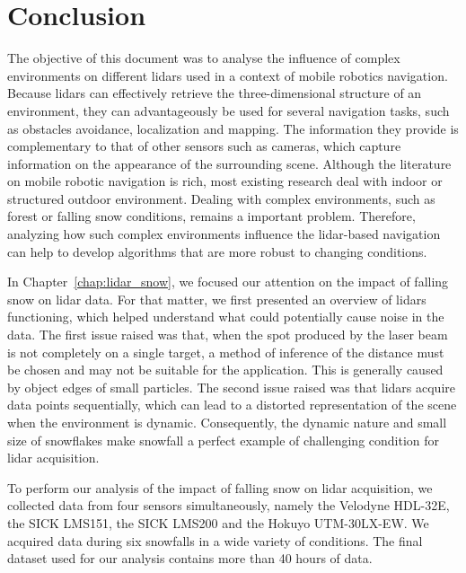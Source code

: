 \chapter*{Conclusion}

The objective of this document was to analyse the influence of complex environments on different \gls*{lidar}s used in a context of mobile robotics navigation. Because \gls*{lidar}s can effectively retrieve the three-dimensional structure of an environment, they can advantageously be used for several navigation tasks, such as obstacles avoidance, localization and mapping. The information they provide is complementary to that of other sensors such as cameras, which capture information on the appearance of the surrounding scene. Although the literature on mobile robotic navigation is rich, most existing research deal with indoor or structured outdoor environment. Dealing with complex environments, such as forest or falling snow conditions, remains a important problem. Therefore, analyzing how such complex environments influence the \gls*{lidar}-based navigation can help to develop algorithms that are more robust to changing conditions.

In Chapter~\ref{chap:lidar_snow}, we focused our attention on the impact of falling snow on \gls*{lidar} data. For that matter, we first presented an overview of \gls*{lidar}s functioning, which helped understand what could potentially cause noise in the data. The first issue raised was that, when the spot produced by the laser beam is not completely on a single target, a method of inference of the distance must be chosen and may not be suitable for the application. This is generally caused by object edges of small particles. The second issue raised was that \gls*{lidar}s acquire data points sequentially, which can lead to a distorted representation of the scene when the environment is dynamic. Consequently, the dynamic nature and small size of snowflakes make snowfall a perfect example of challenging condition for \gls*{lidar} acquisition.

To perform our analysis of the impact of falling snow on \gls*{lidar} acquisition, we collected data from four sensors simultaneously, namely the Velodyne HDL-32E, the SICK LMS151, the SICK LMS200 and the Hokuyo UTM-30LX-EW. We acquired data during six snowfalls in a wide variety of conditions. The final dataset used for our analysis contains more than 40 hours of data. 

